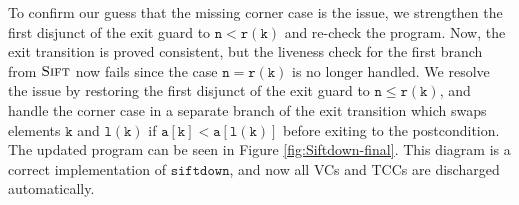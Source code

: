 \documentclass[english,submission]{eptcs}
\newcommand{\procedurelabel}[1]{\small \texttt{#1}}
\newcommand{\situationrule}{\vspace{-1.2ex}\mbox{}\rule[1.2ex]{\linewidth}{0.4pt}\mbox{}}
\newcommand{\procedurerule}{\situationrule}
\newcommand{\invariant}[1]{\small \ensuremath{\mathtt{#1}}}
\newcommand{\declaration}[1]{\small \ensuremath{\mathtt{#1}}}
\newcommand{\ibpid}[1]{\texttt{#1}}
\newcommand{\ibpkw}[1]{\textsf{\textbf{#1}}}
\begin{document}
To confirm our guess that the missing corner case is the issue, we
strengthen the first disjunct of the exit guard to $\mathtt{n<r(k)}$
and re-check the program. Now, the exit transition is proved
consistent, but the liveness check for the first branch from
$\textsc{Sift}$ now fails since the case $\mathtt{n=r(k)}$ is no
longer handled. We resolve the issue by restoring the first disjunct
of the exit guard to $\mathtt{n\le r(k)}$, and handle the corner case
in a separate branch of the exit transition which swaps elements
$\mathtt{k}$ and $\mathtt{l(k)}$ if $\mathtt{a[k]<a[l(k)]}$ before
exiting to the postcondition. The updated program can be seen in
Figure \ref{fig:Siftdown-final}.  This diagram is a correct
implementation of $\mathtt{siftdown}$, and now all VCs and TCCs are
discharged automatically.

\begin{figure}
\noindent \begin{centering}
\end{centering}
\end{figure}
\end{document}
